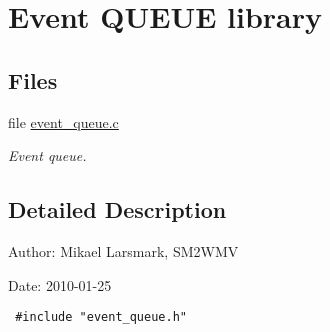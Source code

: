 \hypertarget{group__event__queue__group}{
\section{Event QUEUE library}
\label{group__event__queue__group}
}
\subsection*{Files}
\begin{CompactItemize}
\item 
file \hyperlink{event__queue_8c}{event\_\-queue.c}
\begin{CompactList}\small\item\em Event queue. \item\end{CompactList}

\end{CompactItemize}


\subsection{Detailed Description}
\begin{Desc}
\item[Author:]Mikael Larsmark, SM2WMV \end{Desc}
\begin{Desc}
\item[Date:]2010-01-25 

\begin{Code}\begin{verbatim} #include "event_queue.h" 
\end{verbatim}
\end{Code}

 \end{Desc}
